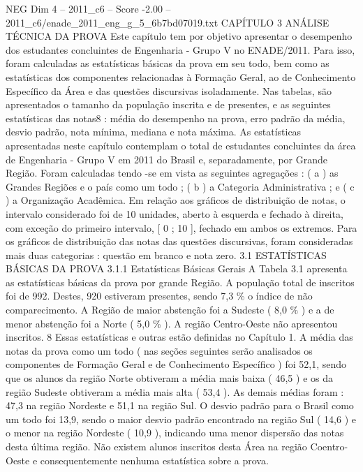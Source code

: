 \begin{textsample}{NEG Dim 4 – 2011\_c6 – Score -2.00 – 2011\_c6/enade\_2011\_eng\_g\_5\_6b7bd07019.txt}  \label{ex:f4_neg_058}
CAPÍTULO 3 ANÁLISE TÉCNICA DA PROVA Este capítulo tem por objetivo apresentar o desempenho dos estudantes concluintes de Engenharia - Grupo V no ENADE/2011.
Para isso, foram calculadas as estatísticas básicas da prova em seu todo, bem como as estatísticas dos componentes relacionadas à Formação Geral, ao de Conhecimento Específico da Área e das questões discursivas isoladamente.
Nas tabelas, são apresentados o tamanho da população inscrita e de presentes, e as seguintes estatísticas das notas8 : média do desempenho na prova, erro padrão da média, desvio padrão, nota mínima, mediana e nota máxima.
As estatísticas apresentadas neste capítulo contemplam o total de estudantes concluintes da área de Engenharia - Grupo V em 2011 do Brasil e, separadamente, por Grande Região.
Foram calculadas tendo -se em vista as seguintes agregações : ( a ) as Grandes Regiões e o país como um todo ; ( b ) a Categoria Administrativa ; e ( c ) a Organização Acadêmica.
Em relação aos gráficos de distribuição de notas, o intervalo considerado foi de 10 unidades, aberto à esquerda e fechado à direita, com exceção do primeiro intervalo, [ 0 ; 10 ], fechado em ambos os extremos.
Para os gráficos de distribuição das notas das questões discursivas, foram consideradas mais duas categorias : questão em branco e nota zero. 3.1 ESTATÍSTICAS BÁSICAS DA PROVA 3.1.1 Estatísticas Básicas Gerais A Tabela 3.1 apresenta as estatísticas básicas da prova por grande Região.
A população total de inscritos foi de 992.
Destes, 920 estiveram presentes, sendo 7,3 \% o índice de não comparecimento.
A Região de maior abstenção foi a Sudeste ( 8,0 \% ) e a de menor abstenção foi a Norte ( 5,0 \% ).
A região Centro-Oeste não apresentou inscritos. 8 Essas estatísticas e outras estão definidas no Capítulo 1.
A média das notas da prova como um todo ( nas seções seguintes serão analisados os componentes de Formação Geral e de Conhecimento Específico ) foi 52,1, sendo que os alunos da região Norte obtiveram a média mais baixa ( 46,5 ) e os da região Sudeste obtiveram a média mais alta ( 53,4 ).
As demais médias foram : 47,3 na região Nordeste e 51,1 na região Sul.
O desvio padrão para o Brasil como um todo foi 13,9, sendo o maior desvio padrão encontrado na região Sul ( 14,6 ) e o menor na região Nordeste ( 10,9 ), indicando uma menor dispersão das notas desta última região.
Não existem alunos inscritos desta Área na região Coentro-Oeste e consequentemente nenhuma estatística sobre a prova.

\end{textsample}
